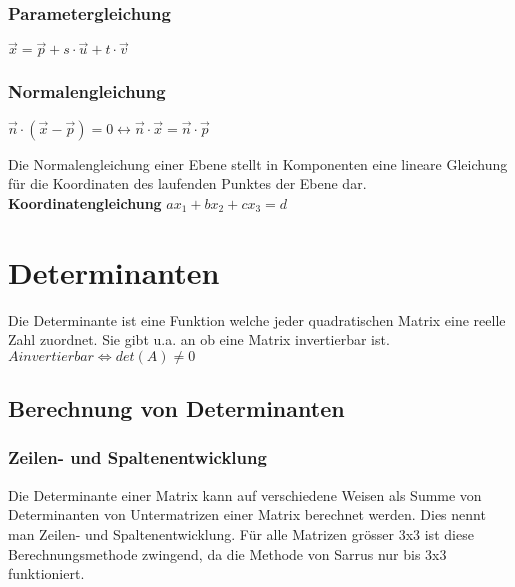 \documentclass[11pt,a4paper,onecolumn]{scrartcl}
\begin{document}
\begin{flushleft}
\subsubsection{Parametergleichung}
$ \vec{x} = \vec{p} + s \cdot \vec{u} + t \cdot \vec{v}$
\subsubsection{Normalengleichung}
$ \vec{n} \cdot (\vec{x}-\vec{p}) = 0 \leftrightarrow \vec{n}\cdot \vec{x} = \vec{n} \cdot \vec{p} $ \linebreak

Die Normalengleichung einer Ebene stellt in Komponenten eine lineare Gleichung für die Koordinaten des laufenden Punktes der Ebene dar. \linebreak\linebreak
\textbf{Koordinatengleichung}\linebreak
$ax_{1}+bx_{2}+cx_{3} = d $


\section{Determinanten}
Die Determinante ist eine Funktion welche jeder quadratischen Matrix eine reelle Zahl zuordnet. Sie gibt u.a. an ob eine Matrix invertierbar ist.\linebreak
$ A invertierbar \Leftrightarrow det(A) \neq 0 $ \linebreak

\subsection{Berechnung von Determinanten}

\subsubsection{Zeilen- und Spaltenentwicklung}
Die Determinante einer Matrix kann auf verschiedene Weisen als Summe von Determinanten von Untermatrizen einer Matrix berechnet werden. Dies nennt man Zeilen- und Spaltenentwicklung. Für alle Matrizen grösser 3x3 ist diese Berechnungsmethode zwingend, da die Methode von Sarrus nur bis 3x3 funktioniert.\linebreak


\end{flushleft}
\end{document}
